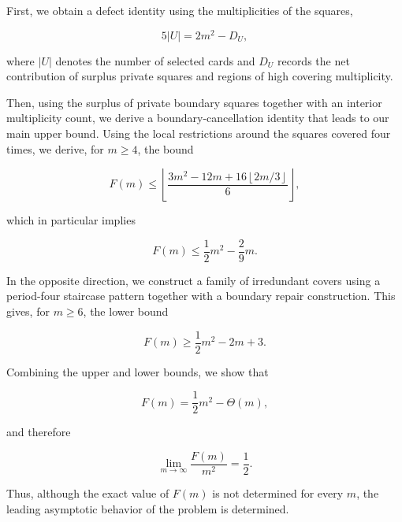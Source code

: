 \documentclass[11pt]{article}
\begin{document}
	
	First, we obtain a defect identity using the multiplicities of the squares,
	
	$$
	5|U|=2m^2-D_U,
	$$
	
	where \(|U|\) denotes the number of selected cards and \(D_U\) records the net contribution of surplus private squares and regions of high covering multiplicity.
	
	Then, using the surplus of private boundary squares together with an interior multiplicity count, we derive a boundary-cancellation identity that leads to our main upper bound. Using the local restrictions around the squares covered four times, we derive, for \(m\geq4\), the bound
	
	$$
	F(m)\leq
	\left\lfloor
	\frac{3m^2-12m+16\left\lfloor 2m/3\right\rfloor}{6}
	\right\rfloor,
	$$
	
	which in particular implies
	
	$$
	F(m) \leq \frac{1}{2}m^2 - \frac{2}{9}m.
	$$
	
	In the opposite direction, we construct a family of irredundant covers using a period-four staircase pattern together with a boundary repair construction. This gives, for \(m\geq6\), the lower bound
	
	$$
	F(m) \geq \frac{1}{2}m^2 - 2m + 3.
	$$
	
	Combining the upper and lower bounds, we show that
	
	$$
	F(m) = \frac{1}{2}m^2 - \Theta(m),
	$$
	
	and therefore
	
	$$
	\lim_{m\to\infty}\frac{F(m)}{m^2}=\frac{1}{2}.
	$$
	
	Thus, although the exact value of \(F(m)\) is not determined for every \(m\), the leading asymptotic behavior of the problem is determined.
	
	
	
	
\end{document}
